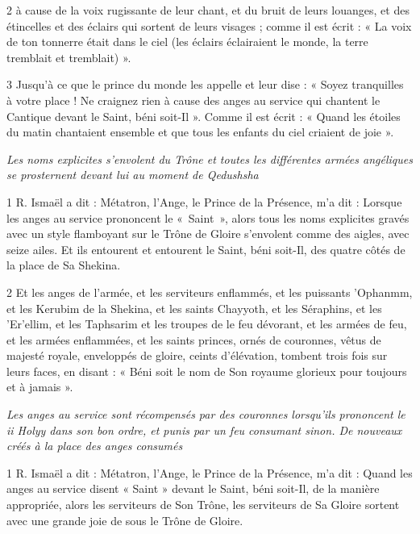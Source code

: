 \par 2 à cause de la voix rugissante de leur chant, et du bruit de leurs louanges, et des étincelles et des éclairs qui sortent de leurs visages ; comme il est écrit : « La voix de ton tonnerre était dans le ciel (les éclairs éclairaient le monde, la terre tremblait et tremblait) ».

\par 3 Jusqu'à ce que le prince du monde les appelle et leur dise : « Soyez tranquilles à votre place ! Ne craignez rien à cause des anges au service qui chantent le Cantique devant le Saint, béni soit-Il ». Comme il est écrit : « Quand les étoiles du matin chantaient ensemble et que tous les enfants du ciel criaient de joie ».




\par \textit{Les noms explicites s'envolent du Trône et toutes les différentes armées angéliques se prosternent devant lui au moment de Qedushsha}

\par 1 R. Ismaël a dit : Métatron, l'Ange, le Prince de la Présence, m'a dit : Lorsque les anges au service prononcent le « Saint », alors tous les noms explicites gravés avec un style flamboyant sur le Trône de Gloire s'envolent comme des aigles, avec seize ailes. Et ils entourent et entourent le Saint, béni soit-Il, des quatre côtés de la place de Sa Shekina.

\par 2 Et les anges de l'armée, et les serviteurs enflammés, et les puissants 'Ophanmm, et les Kerubim de la Shekina, et les saints Chayyoth, et les Séraphins, et les 'Er'ellim, et les Taphsarim et les troupes de le feu dévorant, et les armées de feu, et les armées enflammées, et les saints princes, ornés de couronnes, vêtus de majesté royale, enveloppés de gloire, ceints d'élévation, tombent trois fois sur leurs faces, en disant : « Béni soit le nom de Son royaume glorieux pour toujours et à jamais ».



\par \textit{Les anges au service sont récompensés par des couronnes lorsqu'ils prononcent le ii Holyy dans son bon ordre, et punis par un feu consumant sinon. De nouveaux créés à la place des anges consumés}

\par 1 R. Ismaël a dit : Métatron, l'Ange, le Prince de la Présence, m'a dit : Quand les anges au service disent « Saint » devant le Saint, béni soit-Il, de la manière appropriée, alors les serviteurs de Son Trône, les serviteurs de Sa Gloire sortent avec une grande joie de sous le Trône de Gloire.

